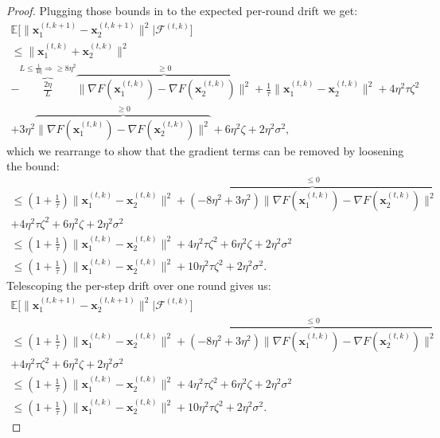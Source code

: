 \begin{proof}
    Plugging those bounds in to the expected per-round drift we get:
    \begin{align*}
        \mathbb{E} \bigg[ \| \bm{x}_1^{(t,k+1)} - \bm{x}_2^{(t,k+1)} \|^2 | \mathcal{F}^{(t,k)} \bigg] \\
        \leq \| \bm{x}_1^{(t,k)} + \bm{x}_2^{(t,k)} \|^2 \\
        -\overbrace{ \frac{2 \eta}{L}}^{L \leq \frac{1}{4\eta} \Rightarrow \geq 8 \eta^2} \overbrace{  \| \nabla F ( \bm{x}_1^{(t,k)}) -\nabla F ( \bm{x}_2^{(t,k)})  \|^2 }^{\geq 0} 
        + \frac{1}{ \tau}  \| \bm{x}_1^{(t,k)} - \bm{x}_2^{(t,k)} \|^2
        + 4 \eta^2 \tau \zeta^2 \\
        + 3 \eta^2 \overbrace{ \| \nabla F ( \bm{x}_1^{(t,k)})  - \nabla F ( \bm{x}_2^{(t,k)}) \|^2 }^{\geq 0} + 6 \eta^2 \zeta  + 2 \eta^2 \sigma^2,
    \end{align*}
    which we rearrange to show that the gradient terms can be removed by loosening the bound:
    \begin{align*}
        \leq (1 + \frac{1}{\tau}) \| \bm{x}_1^{(t,k)} - \bm{x}_2^{(t,k)} \|^2 
        +\overbrace{(-8\eta^2+3 \eta^2)  \| \nabla F ( \bm{x}_1^{(t,k)}) -\nabla F ( \bm{x}_2^{(t,k)})  \|^2}^{\leq 0} \\
        + 4 \eta^2 \tau \zeta^2  + 6 \eta^2 \zeta  + 2 \eta^2 \sigma^2 \\ 
        \leq  (1 + \frac{1}{\tau}) \| \bm{x}_1^{(t,k)} - \bm{x}_2^{(t,k)} \|^2 + 4 \eta^2 \tau \zeta^2  + 6 \eta^2 \zeta  + 2 \eta^2 \sigma^2 \\ 
        \leq  (1 + \frac{1}{\tau}) \| \bm{x}_1^{(t,k)} - \bm{x}_2^{(t,k)} \|^2 + 10 \eta^2 \tau \zeta^2   + 2 \eta^2 \sigma^2.
    \end{align*}
    Telescoping the per-step drift over one round gives us:
    \begin{align*}
        \mathbb{E} \bigg[ \| \bm{x}_1^{(t,k+1)} - \bm{x}_2^{(t,k+1)} \|^2 | \mathcal{F}^{(t,k)} \bigg] \\
        \leq (1 + \frac{1}{\tau}) \| \bm{x}_1^{(t,k)} - \bm{x}_2^{(t,k)} \|^2 
        +\overbrace{(-8\eta^2+3 \eta^2)  \| \nabla F ( \bm{x}_1^{(t,k)}) -\nabla F ( \bm{x}_2^{(t,k)})  \|^2}^{\leq 0} \\
        + 4 \eta^2 \tau \zeta^2  + 6 \eta^2 \zeta  + 2 \eta^2 \sigma^2 \\ 
        \leq  (1 + \frac{1}{\tau}) \| \bm{x}_1^{(t,k)} - \bm{x}_2^{(t,k)} \|^2 + 4 \eta^2 \tau \zeta^2  + 6 \eta^2 \zeta  + 2 \eta^2 \sigma^2 \\ 
        \leq  (1 + \frac{1}{\tau}) \| \bm{x}_1^{(t,k)} - \bm{x}_2^{(t,k)} \|^2 + 10 \eta^2 \tau \zeta^2   + 2 \eta^2 \sigma^2.
    \end{align*}


\end{proof}
